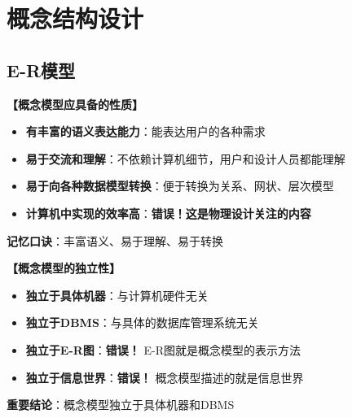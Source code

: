 \documentclass[12pt, a4paper]{article}
\newenvironment{bluebox}[1]{%
  \begin{trivlist}
  \item[\hskip\labelsep \textbf{#1}]
  \setlength{\parskip}{0.5ex}
  \setlength{\itemsep}{0.5ex}
}{%
  \end{trivlist}
  }
\begin{document}
\section{概念结构设计}

\subsection{E-R模型}

\begin{bluebox}{概念模型特点}
	\textbf{【概念模型应具备的性质】}

	\begin{itemize}[leftmargin=*, nosep]
		\item \textbf{有丰富的语义表达能力}：能表达用户的各种需求
		\item \textbf{易于交流和理解}：不依赖计算机细节，用户和设计人员都能理解
		\item \textbf{易于向各种数据模型转换}：便于转换为关系、网状、层次模型
		\item \textbf{计算机中实现的效率高}：\textbf{错误！这是物理设计关注的内容}
	\end{itemize}

	\textbf{记忆口诀}：丰富语义、易于理解、易于转换
\end{bluebox}

\begin{bluebox}{概念模型独立性}
	\textbf{【概念模型的独立性】}

	\begin{itemize}[leftmargin=*, nosep]
		\item \textbf{独立于具体机器}：与计算机硬件无关
		\item \textbf{独立于DBMS}：与具体的数据库管理系统无关
		\item \textbf{独立于E-R图}：\textbf{错误！} E-R图就是概念模型的表示方法
		\item \textbf{独立于信息世界}：\textbf{错误！} 概念模型描述的就是信息世界
	\end{itemize}

	\textbf{重要结论}：概念模型独立于具体机器和DBMS
\end{bluebox}
\end{document}

